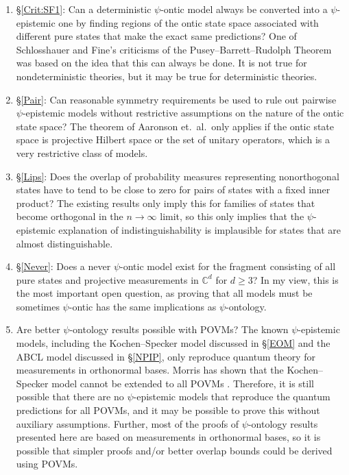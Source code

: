 \documentclass[DIV=calc,paper=a4,fontsize=11pt,twocolumn]{scrartcl} %
\theoremstyle{definition}
\theoremstyle{plain}
\begin{document}
\begin{enumerate}
\item \S\ref{Crit:SF1}: Can a deterministic $\psi$-ontic model always
be converted into a $\psi$-epistemic one by finding regions of the
ontic state space associated with different pure states that make
the exact same predictions?  One of Schlosshauer and Fine's
criticisms of the Pusey--Barrett--Rudolph Theorem was based on the idea that this can
always be done.  It is not true for nondeterministic theories, but
it may be true for deterministic theories.
\item \S\ref{Pair}: Can reasonable symmetry requirements be used to
rule out pairwise $\psi$-epistemic models without restrictive
assumptions on the nature of the ontic state space?  The theorem of
Aaronson et.\ al.\ only applies if the ontic state space is
projective Hilbert space or the set of unitary operators, which is a
very restrictive class of models.
\item \S\ref{Lips}: Does the overlap of probability measures
representing nonorthogonal states have to tend to be close to zero
for pairs of states with a fixed inner product?  The existing
results only imply this for families of states that become
orthogonal in the $n \rightarrow \infty$ limit, so this only implies
that the $\psi$-epistemic explanation of indistinguishability is
implausible for states that are almost distinguishable.
\item \S\ref{Never}: Does a never $\psi$-ontic model exist for the
fragment consisting of all pure states and projective measurements
in $\mathbb{C}^d$ for $d \geq 3$?  In my view, this is the most
important open question, as proving that all models must be
sometimes $\psi$-ontic has the same implications as $\psi$-ontology.
\item Are better $\psi$-ontology results possible with POVMs?  The
known $\psi$-epistemic models, including the Kochen--Specker model
discussed in \S\ref{EOM} and the ABCL model discussed in
\S\ref{NPIP}, only reproduce quantum theory for measurements in
orthonormal bases.  Morris has shown that the Kochen--Specker model
cannot be extended to all POVMs \cite{Morris2009}.  Therefore, it
is still possible that there are no $\psi$-epistemic models that
reproduce the quantum predictions for all POVMs, and it may be
possible to prove this without auxiliary assumptions.  Further, most
of the proofs of $\psi$-ontology results presented here are based on
measurements in orthonormal bases, so it is possible that simpler
proofs and/or better overlap bounds could be derived using POVMs.

\end{enumerate}
\end{document}
